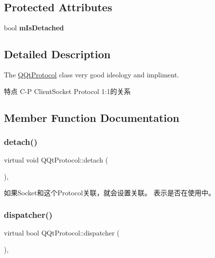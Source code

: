 \subsection*{Protected Attributes}
\begin{DoxyCompactItemize}
\item 
\mbox{\label{class_q_qt_protocol_a75d40f91c31b9a2d9f56dee92b9e3c35}} 
bool {\bfseries m\+Is\+Detached}
\end{DoxyCompactItemize}


\subsection{Detailed Description}
The \mbox{\hyperlink{class_q_qt_protocol}{Q\+Qt\+Protocol}} class very good ideology and impliment. 

特点 C-\/P Client\+Socket Protocol 1\+:1的关系 

\subsection{Member Function Documentation}
\mbox{\label{class_q_qt_protocol_a80b4de63c9a5bab33c22b7c47bd22c00}} 
\subsubsection{\texorpdfstring{detach()}{detach()}}
{\footnotesize\ttfamily virtual void Q\+Qt\+Protocol\+::detach (\begin{DoxyParamCaption}{ }\end{DoxyParamCaption})\hspace{0.3cm}{\ttfamily [inline]}, {\ttfamily [virtual]}}

如果\+Socket和这个\+Protocol关联，就会设置关联。 表示是否在使用中。 \mbox{\label{class_q_qt_protocol_a35a69c4b89c8cf7459038f40d75e0dc9}} 
\subsubsection{\texorpdfstring{dispatcher()}{dispatcher()}}
{\footnotesize\ttfamily virtual bool Q\+Qt\+Protocol\+::dispatcher (\begin{DoxyParamCaption}\item[{const Q\+Byte\+Array \&}]{ }\end{DoxyParamCaption})\hspace{0.3cm}{\ttfamily [inline]}, {\ttfamily [virtual]}}



